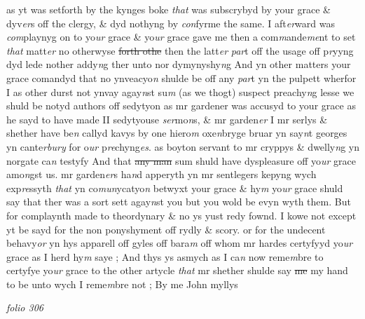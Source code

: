 \documentclass[12pt, a4paper]{book}
\begin{document}
			as yt was setforth by the kynges boke \textit{that} was subscrybyd by your grace \& dyv\textit{er}s off the clergy, \& dyd nothyng by \textit{con}fyrme the same. I aft\textit{er}ward was \textit{com}playnyg on to yo\textit{ur} grace \& yo\textit{ur} grace gave me then a com\textit{m}ande\textit{me}nt to set \textit{that} matt\textit{er} no otherwyse \sout{forth othe} then the latt\textit{er}
               \textit{par}t off the usage off p\textit{r}yyng dyd lede nother addy\textit{n}g ther unto nor dymynyshy\textit{n}g And yn other matters your grace comandyd that no ynveacyo\textit{n} shulde be off any \textit{par}t yn the pulpett wherfor I as other durst not ynvay agay\textit{n}st su\textit{m} (as we thogt) suspect preachy\textit{n}g lesse we shuld be notyd authors off sedytyon as mr gardener was accusyd to your grace as he sayd to have made II sedytyouse \textit{ser}mo\textit{n}s, \& mr garden\textit{er} I mr serlys \& shether have be\textit{n} callyd kavys by one hiero\textit{m} oxe\textit{n}bryge bruar yn say\textit{n}t georges yn cante\textit{rbury} for o\textit{ur} p\textit{re}chyng\textit{es}. as boyton servant to mr cryppys \& dwelly\textit{n}g yn norgate ca\textit{n} testyfy And that \sout{any man}
               sum 
			shuld have dyspleasure off yo\textit{ur} grace amo\textit{n}gst us. mr garden\textit{er}s ha\textit{n}d apperyth yn mr sentlegers kepyng wych exp\textit{re}ssyth \textit{that} yn co\textit{mun}ycatyo\textit{n} betwyxt your grace \& hy\textit{m} yo\textit{ur} grace shuld say that ther was a sort sett agay\textit{n}st you but you wold be evyn wyth them. But for complaynth made to theordynary \& no ys yust redy fownd. I kowe not except yt be sayd for the non ponyshyment off rydly \& scory. or for the undecent behavy\textit{or} yn hys apparell off gyles off bara\textit{m }off whom mr hardes certyfyyd yo\textit{ur} grace as I herd hy\textit{m} saye ; And thys ys asmych as I ca\textit{n} now reme\textit{m}bre to certyfye yo\textit{ur} grace to the other artycle \textit{that} mr  shether shulde say \sout{me }my hand to be unto wych I reme\textit{m}bre not ;  By me John myllys          

\dotfill
					

\textit{folio 306}


         \vspace{4cm}
         
\dotfill
					
\end{document}
